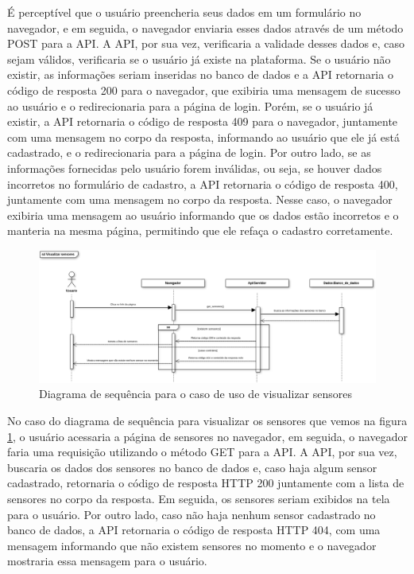 \documentclass[tcc,capa]{texufpel}
\begin{document}
É perceptível que o usuário preencheria seus dados em um formulário no navegador, e em seguida, o navegador enviaria esses dados através de um método POST para a API. A API, por sua vez, verificaria a validade desses dados e, caso sejam válidos, verificaria se o usuário já existe na plataforma. Se o usuário não existir, as informações seriam inseridas no banco de dados e a API retornaria o código de resposta 200 para o navegador, que exibiria uma mensagem de sucesso ao usuário e o redirecionaria para a página de login. Porém, se o usuário já existir, a API retornaria o código de resposta 409 para o navegador, juntamente com uma mensagem no corpo da resposta, informando ao usuário que ele já está cadastrado, e o redirecionaria para a página de login. Por outro lado, se as informações fornecidas pelo usuário forem inválidas, ou seja, se houver dados incorretos no formulário de cadastro, a API retornaria o código de resposta 400, juntamente com uma mensagem no corpo da resposta. Nesse caso, o navegador exibiria uma mensagem ao usuário informando que os dados estão incorretos e o manteria na mesma página, permitindo que ele refaça o cadastro corretamente.

\begin{figure}[htbp]
  \centering \includegraphics[scale=.3]{assets/sd_visualizarsensores.png}
  \caption{Diagrama de sequência para o caso de uso de visualizar sensores}
  \label{sdvisualizarsensores}
\end{figure}
\newpage

No caso do diagrama de sequência para visualizar os sensores que vemos na figura \ref{sdvisualizarsensores}, o usuário acessaria a página de sensores no navegador, em seguida, o navegador faria uma requisição utilizando o método GET para a API. A API, por sua vez, buscaria os dados dos sensores no banco de dados e, caso haja algum sensor cadastrado, retornaria o código de resposta HTTP 200 juntamente com a lista de sensores no corpo da resposta. Em seguida, os sensores seriam exibidos na tela para o usuário. Por outro lado, caso não haja nenhum sensor cadastrado no banco de dados, a API retornaria o código de resposta HTTP 404, com uma mensagem informando que não existem sensores no momento e o navegador mostraria essa mensagem para o usuário.
\end{document}
